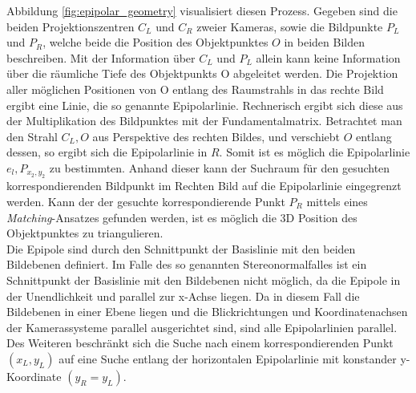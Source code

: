 \noindent
Abbildung \ref{fig:epipolar_geometry} visualisiert diesen Prozess. Gegeben sind die beiden Projektionszentren $C_L$ und $C_R$ zweier Kameras, sowie die Bildpunkte $P_L$ und $P_R$, welche beide die Position des Objektpunktes $O$ in beiden Bilden beschreiben. Mit der Information über $C_L$ und $P_L$ allein kann keine Information über die räumliche Tiefe des Objektpunkts O abgeleitet werden. Die Projektion aller möglichen Positionen von O entlang des Raumstrahls in das rechte Bild ergibt eine Linie, die so genannte Epipolarlinie. Rechnerisch ergibt sich diese aus der Multiplikation des Bildpunktes mit der Fundamentalmatrix. Betrachtet man den Strahl $C_L,O$ aus Perspektive des rechten Bildes, und verschiebt $O$ entlang dessen, so ergibt sich die Epipolarlinie in $R$. Somit ist es möglich die Epipolarlinie $e_l,P_{x_2,y_2}$ zu bestimmten. Anhand dieser kann der Suchraum für den gesuchten korrespondierenden Bildpunkt im Rechten Bild auf die Epipolarlinie eingegrenzt werden. Kann der der gesuchte korrespondierende Punkt $P_R$ mittels eines \emph{Matching}-Ansatzes gefunden werden, ist es möglich die 3D Position des Objektpunktes zu triangulieren.\\

\noindent
Die Epipole sind durch den Schnittpunkt der Basislinie mit den beiden Bildebenen definiert. Im Falle des so genannten Stereonormalfalles ist ein Schnittpunkt der Basislinie mit den Bildebenen nicht möglich, da die Epipole in der Unendlichkeit und parallel zur x-Achse liegen. Da in diesem Fall die Bildebenen in einer Ebene liegen und die Blickrichtungen und Koordinatenachsen der Kamerassysteme parallel ausgerichtet sind, sind alle Epipolarlinien parallel. Des Weiteren beschränkt sich die Suche nach einem korrespondierenden Punkt $(x_L, y_L)$ auf eine Suche entlang der horizontalen Epipolarlinie mit konstander y-Koordinate $(y_R=y_L)$.


